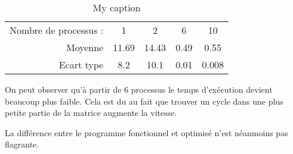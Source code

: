\documentclass{article}
\begin{document}
\begin{table}[]
\centering
\caption{My caption}
\label{my-label}
\begin{tabular}{rcccc}
\multicolumn{1}{l}{Nombre de processus :} & 1     & 2     & 6    & 10    \\
Moyenne                                   & 11.69 & 14.43 & 0.49 & 0.55  \\
Ecart type                                & 8.2   & 10.1  & 0.01 & 0.008
\end{tabular}
\end{table}

On peut observer qu'à partir de 6 processus le temps d'exécution devient beaucoup plus faible. Cela est du au fait que trouver un cycle dans une plus petite partie de la matrice augmente la vitesse.

La différence entre le programme fonctionnel et optimisé n'est néanmoins pas flagrante.
\end{document}
